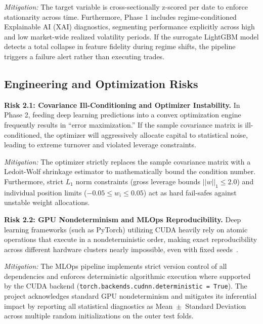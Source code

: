 \documentclass[twoside,final]{hcmut-report}
\begin{document}
\textit{Mitigation:} The target variable is cross-sectionally z-scored per date to enforce stationarity across time. Furthermore, Phase 1 includes regime-conditioned Explainable AI (XAI) diagnostics, segmenting performance explicitly across high and low market-wide realized volatility periods. If the surrogate LightGBM model detects a total collapse in feature fidelity during regime shifts, the pipeline triggers a failure alert rather than executing trades.

\subsection{Engineering and Optimization Risks}

\textbf{Risk 2.1: Covariance Ill-Conditioning and Optimizer Instability.} In Phase 2, feeding deep learning predictions into a convex optimization engine frequently results in ``error maximization.'' If the sample covariance matrix is ill-conditioned, the optimizer will aggressively allocate capital to statistical noise, leading to extreme turnover and violated leverage constraints.

\textit{Mitigation:} The optimizer strictly replaces the sample covariance matrix with a Ledoit-Wolf shrinkage estimator to mathematically bound the condition number. Furthermore, strict $L_1$ norm constraints (gross leverage bounds $||w||_1 \le 2.0$) and individual position limits ($-0.05 \le w_i \le 0.05$) act as hard fail-safes against unstable weight allocations.

\textbf{Risk 2.2: GPU Nondeterminism and MLOps Reproducibility.} Deep learning frameworks (such as PyTorch) utilizing CUDA heavily rely on atomic operations that execute in a nondeterministic order, making exact reproducibility across different hardware clusters nearly impossible, even with fixed seeds~\cite{Picard2021}.

\textit{Mitigation:} The MLOps pipeline implements strict version control of all dependencies and enforces deterministic algorithmic execution where supported by the CUDA backend (\texttt{torch.backends.cudnn.deterministic = True}). The project acknowledges standard GPU nondeterminism and mitigates its inferential impact by reporting all statistical diagnostics as Mean~$\pm$~Standard Deviation across multiple random initializations on the outer test folds.
\end{document}
